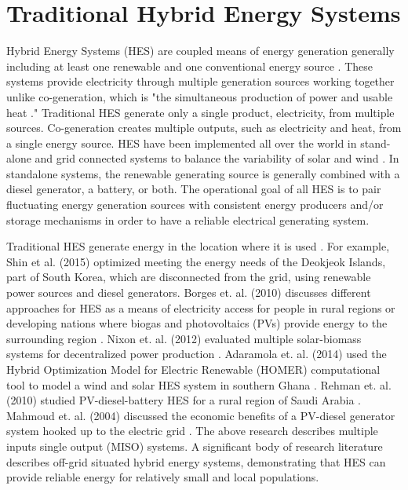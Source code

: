 \documentclass[12pt]{UIdahoMastersThesis}
\begin{document}
\section{Traditional Hybrid Energy Systems}
Hybrid Energy Systems (HES) are coupled means of energy generation generally including at least one renewable and one conventional energy source \cite {Ibrahim2011}. These systems provide electricity through multiple generation sources working together unlike co-generation, which is "the simultaneous production of power and usable heat \cite{Rosen2005}." Traditional HES generate only a single product, electricity, from multiple sources. Co-generation creates multiple outputs, such as electricity and heat, from a single energy source. HES have been implemented all over the world in stand-alone and grid connected systems to balance the variability of solar and wind \cite {Garcia2015, Qi2014, Shin2015, Nixon2012, Adaramola2014, Goodbody2013, BorgesNeto2010, McGowan1996}. In standalone systems, the renewable generating source is generally combined with a diesel generator, a battery, or both. The operational goal of all HES is to pair fluctuating energy generation sources with consistent energy producers and/or storage mechanisms in order to have a reliable electrical generating system. 

Traditional HES generate energy in the location where it is used \cite {Shin2015, Nixon2012, Adaramola2014, Goodbody2013, McGowan1996}. For example, Shin et al. (2015) optimized meeting the energy needs of the Deokjeok Islands, part of South Korea, which are disconnected from the grid, using renewable power sources and diesel generators. Borges et. al. (2010) discusses different approaches for HES as a means of electricity access for people in rural regions or developing nations where biogas and photovoltaics (PVs) provide energy to the surrounding region \cite{BorgesNeto2010}. Nixon et. al. (2012) evaluated multiple solar-biomass systems for decentralized power production \cite{Nixon2012}. Adaramola et. al. (2014) used the Hybrid Optimization Model for Electric Renewable (HOMER) computational tool to model a wind and solar HES system in southern Ghana \cite{Adaramola2014}. Rehman et. al. (2010) studied PV-diesel-battery HES for a rural region of Saudi Arabia \cite{Rehman2010}. Mahmoud et. al. (2004) discussed the economic benefits of a PV-diesel generator system hooked up to the electric grid \cite {Mahmoud2004}. The above research describes multiple inputs single output (MISO) systems\cite{Garcia2013}. A significant body of research literature describes off-grid situated hybrid energy systems, demonstrating that HES can provide reliable energy for relatively small and local populations. 
\end{document}
